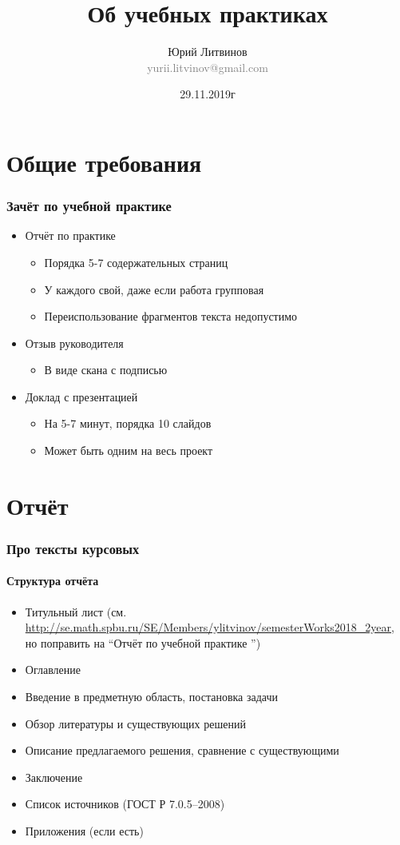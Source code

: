 \documentclass[xetex,mathserif,serif]{beamer}
\title{Об учебных практиках}
\author[Юрий Литвинов]{Юрий Литвинов\\\small{\textcolor{gray}{yurii.litvinov@gmail.com}}}
\date{29.11.2019г}
\begin{document}
	\frame{\titlepage}

	\section{Общие требования}

	\begin{frame}
		\frametitle{Зачёт по учебной практике}
		\begin{itemize}
			\item Отчёт по практике
			\begin{itemize}
				\item Порядка 5-7 содержательных страниц
				\item У каждого свой, даже если работа групповая
				\item Переиспользование фрагментов текста недопустимо
			\end{itemize}
			\item Отзыв руководителя
			\begin{itemize}
				\item В виде скана с подписью
			\end{itemize}
			\item Доклад с презентацией
			\begin{itemize}
				\item На 5-7 минут, порядка 10 слайдов
				\item Может быть одним на весь проект
			\end{itemize}
		\end{itemize}
	\end{frame}

	\section{Отчёт}

	\begin{frame}
		\frametitle{Про тексты курсовых}
		\framesubtitle{Структура отчёта}
		\begin{itemize}
			\item Титульный лист (см. \url{http://se.math.spbu.ru/SE/Members/ylitvinov/semesterWorks2018_2year}, но поправить на ``Отчёт по учебной практике '')
			\item Оглавление
			\item Введение в предметную область, постановка задачи
			\item Обзор литературы и существующих решений
			\item Описание предлагаемого решения, сравнение с существующими
			\item Заключение
			\item Список источников (ГОСТ Р 7.0.5--2008)
			\item Приложения (если есть)
		\end{itemize}
	\end{frame}
\end{document}
